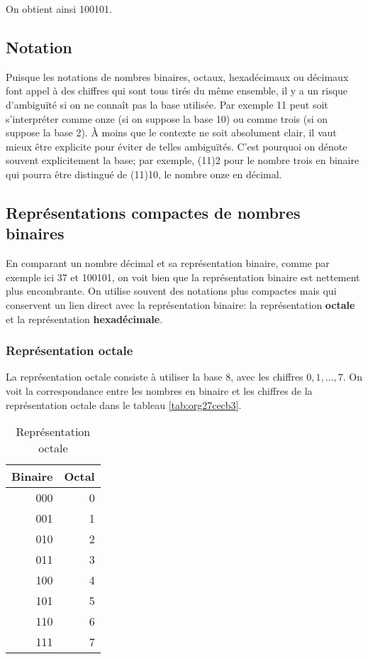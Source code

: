 \documentclass[11pt]{article}
\begin{document}
On obtient ainsi 100101.

\subsection{Notation}
\label{sec:org22fb00a}

Puisque les notations de nombres binaires, octaux, hexadécimaux ou
décimaux font appel à des chiffres qui sont tous tirés du même
ensemble, il y a un risque d'ambiguïté si on ne connaît pas la base
utilisée. Par exemple 11 peut soit s'interpréter comme onze (si on
suppose la base 10) ou comme trois (si on suppose la base 2). À
moins que le contexte ne soit absolument clair, il vaut mieux être
explicite pour éviter de telles ambiguïtés. C'est pourquoi on dénote
souvent explicitement la base; par exemple, (11)2 pour le nombre
trois en binaire qui pourra être distingué de (11)10, le nombre onze
en décimal.

\subsection{Représentations compactes de nombres binaires}
\label{sec:orgd1b42b4}

En comparant un nombre décimal et sa représentation binaire, comme par
exemple ici 37 et 100101, on voit bien que la représentation binaire
est nettement plus encombrante. On utilise souvent des notations plus
compactes mais qui conservent un lien direct avec la représentation
binaire: la représentation \textbf{octale} et la représentation
\textbf{hexadécimale}.

\subsubsection{Représentation octale}
\label{sec:org398d7c6}

La représentation octale consiste à utiliser la base 8, avec les
chiffres \(0, 1, \ldots, 7\). On voit la correspondance entre les
nombres en binaire et les chiffres de la représentation octale dans le
tableau \ref{tab:org27cecb3}.

\begin{table}[htbp]
\caption{\label{tab:orgfe49f16}Représentation octale}
\centering
\begin{tabular}{rr}
Binaire & Octal\\[0pt]
\hline
000 & 0\\[0pt]
001 & 1\\[0pt]
010 & 2\\[0pt]
011 & 3\\[0pt]
100 & 4\\[0pt]
101 & 5\\[0pt]
110 & 6\\[0pt]
111 & 7\\[0pt]
\end{tabular}
\end{table}
\end{document}
